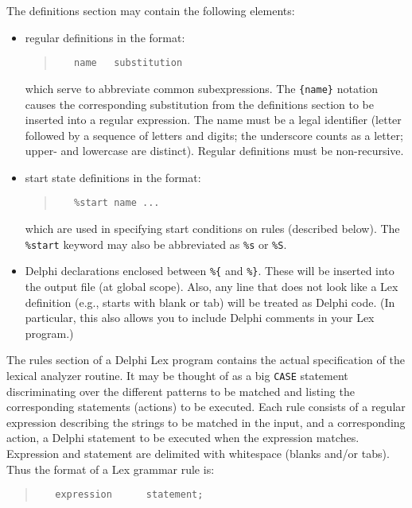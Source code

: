 \documentclass[a4paper]{article}
\begin{document}
The definitions section may contain the following elements:
\begin{itemize}
   \item
      regular definitions in the format:
      \begin{quote}\begin{verbatim}
   name   substitution
      \end{verbatim}\end{quote}
      which serve to abbreviate common subexpressions. The \verb"{name}"
      notation causes the corresponding substitution from the definitions
      section to be inserted into a regular expression. The name must be
      a legal identifier (letter followed by a sequence of letters and digits;
      the underscore counts as a letter; upper- and lowercase are distinct).
      Regular definitions must be non-recursive.
   \item
      start state definitions in the format:
      \begin{quote}\begin{verbatim}
   %start name ...
      \end{verbatim}\end{quote}
      which are used in specifying start conditions on rules (described
      below). The \verb"%start" keyword may also be abbreviated as \verb"%s"
      or \verb"%S".
   \item
      Delphi declarations enclosed between \verb"%{" and \verb"%}".
      These will be inserted into the output file (at global scope). Also,
      any line that does not look like a Lex definition (e.g., starts with
      blank or tab) will be treated as Delphi code. (In particular,
      this also allows you to include Delphi comments in your Lex
      program.)
\end{itemize}

The rules section of a Delphi Lex program contains the actual specification of
the lexical analyzer routine. It may be thought of as a big \verb"CASE"
statement discriminating over the different patterns to be matched and listing the
corresponding statements (actions) to be executed. Each rule consists of a
regular expression describing the strings to be matched in the input, and a
corresponding action, a Delphi statement to be executed when the
expression matches. Expression and statement are delimited with whitespace
(blanks and/or tabs). Thus the format of a Lex grammar rule is:

\begin{quote}\begin{verbatim}
   expression      statement;
\end{verbatim}\end{quote}
\end{document}
